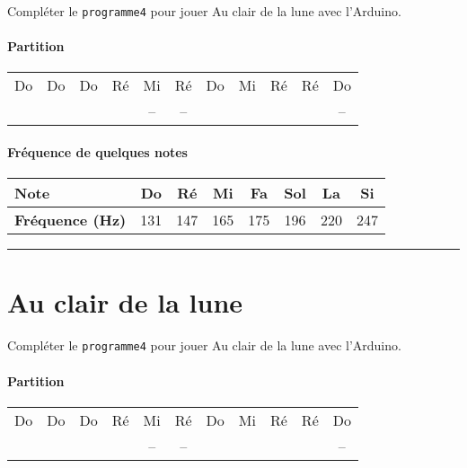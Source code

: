 \documentclass[12pt,a4paper]{article}
\begin{document}
Compléter le \texttt{programme4} pour jouer \og Au clair de la lune \fg{} avec l'Arduino.

\paragraph{Partition}

\begin{center}
\begin{tabular}{|ccccccccccc|}
\hline
Do 		& Do 		& Do 		& Ré 		& Mi 		& Ré 		& Do 		& Mi 		& Ré 		& Ré 		& Do \\
\cdot	& \cdot	& \cdot	& \cdot	& --			& --			& \cdot	& \cdot	& \cdot	& \cdot	& -- \\
\hline
\end{tabular}
\end{center}

\thispagestyle{empty}

\paragraph{Fréquence de quelques notes}

\begin{center}
\begin{tabular}{l|c|c|c|c|c|c|c}
\textbf{Note}						& \textbf{Do} & \textbf{Ré} & \textbf{Mi} & \textbf{Fa} & \textbf{Sol} & \textbf{La} & \textbf{Si} \\
\hline
\textbf{Fréquence (Hz)} 	& 131 & 147 & 165 & 175 & 196 & 220 & 247 \\
\end{tabular}
\end{center}

\hrule{}

\section*{Au clair de la lune}

Compléter le \texttt{programme4} pour jouer \og Au clair de la lune \fg{} avec l'Arduino.

\paragraph{Partition}

\begin{center}
\begin{tabular}{|ccccccccccc|}
\hline
Do 		& Do 		& Do 		& Ré 		& Mi 		& Ré 		& Do 		& Mi 		& Ré 		& Ré 		& Do \\
\cdot	& \cdot	& \cdot	& \cdot	& --			& --			& \cdot	& \cdot	& \cdot	& \cdot	& -- \\
\hline
\end{tabular}
\end{center}
\end{document}
